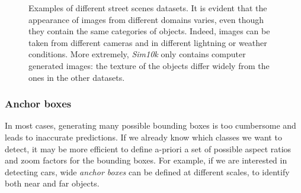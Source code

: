 \documentclass[%
    corpo=12pt,
    twoside,
    stile=classica,   
    tipotesi=magistrale,
    evenboxes,
    english,
	numerazioneromana,
]{toptesi}
\begin{document}
\begin{figure}[p]
	\centering
	\caption{Examples of different street scenes datasets. It is evident that the appearance of images from different domains varies, even though they contain the same categories of objects. Indeed, images can be taken from different cameras and in different lightning or weather conditions. More extremely, \textit{Sim10k} only contains computer generated images: the texture of the objects differ widely from the ones in the other datasets.}
	\label{fig:datasets}
\end{figure}

\subsubsection{Anchor boxes}\label{sec:anchor}
In most cases, generating many possible bounding boxes is too cumbersome and leads to inaccurate predictions. If we already know which classes we want to detect, it may be more efficient to define a-priori a set of possible aspect ratios and zoom factors for the bounding boxes. For example, if we are interested in detecting cars, wide \textit{anchor boxes} can be defined at different scales, to identify both near and far objects.
\end{document}
